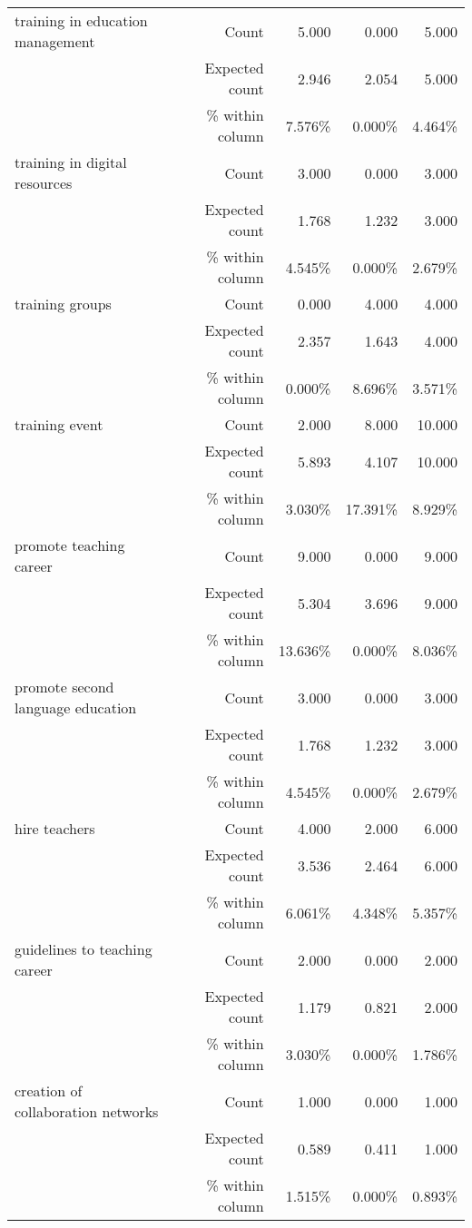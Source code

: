 \documentclass[6pt, oneside]{article}   	%
\begin{document}
\begin{table}[h]
{\begin{tabular}{lrrrr}
			training in education management & Count & 5.000 & 0.000 & 5.000  \\
			 & Expected count & 2.946 & 2.054 & 5.000  \\
			 &  \% within column & 7.576\% & 0.000\% & 4.464\%  \\
			training in digital resources & Count & 3.000 & 0.000 & 3.000  \\
			 & Expected count & 1.768 & 1.232 & 3.000  \\
			 &  \% within column & 4.545\% & 0.000\% & 2.679\%  \\
			training groups & Count & 0.000 & 4.000 & 4.000  \\
			 & Expected count & 2.357 & 1.643 & 4.000  \\
			 &  \% within column & 0.000\% & 8.696\% & 3.571\%  \\
			training event & Count & 2.000 & 8.000 & 10.000  \\
			 & Expected count & 5.893 & 4.107 & 10.000  \\
			 &  \% within column & 3.030\% & 17.391\% & 8.929\%  \\
			promote teaching career & Count & 9.000 & 0.000 & 9.000  \\
			 & Expected count & 5.304 & 3.696 & 9.000  \\
			 &  \% within column & 13.636\% & 0.000\% & 8.036\%  \\
			promote second language education & Count & 3.000 & 0.000 & 3.000  \\
			 & Expected count & 1.768 & 1.232 & 3.000  \\
			 &  \% within column & 4.545\% & 0.000\% & 2.679\%  \\
			hire teachers & Count & 4.000 & 2.000 & 6.000  \\
			 & Expected count & 3.536 & 2.464 & 6.000  \\
			 &  \% within column & 6.061\% & 4.348\% & 5.357\%  \\
			guidelines to teaching career & Count & 2.000 & 0.000 & 2.000  \\
			 & Expected count & 1.179 & 0.821 & 2.000  \\
			 &  \% within column & 3.030\% & 0.000\% & 1.786\%  \\
			creation of collaboration networks & Count & 1.000 & 0.000 & 1.000  \\
			 & Expected count & 0.589 & 0.411 & 1.000  \\
			 &  \% within column & 1.515\% & 0.000\% & 0.893\%  \\

\end{tabular}}
\end{table}
\end{document}

